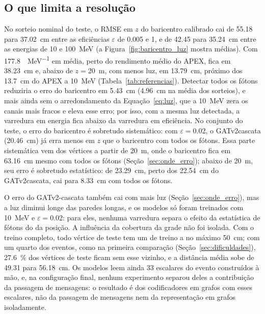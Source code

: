 \subsection{O que limita a resolução}
\label{sec:limites}

No sorteio nominal do teste, o RMSE em $z$ do baricentro calibrado cai de \num{55.18} para \qty{37.02}{\cm} entre as eficiências $\varepsilon$ de \num{0.005} e \num{1}, e de \num{42.45} para \qty{35.24}{\cm} entre as energias de \num{10} e \qty{100}{\MeV} (a Figura~\ref{fig:baricentro_luz} mostra médias). Com \qty{177.8}{\pe\per\MeV} em média, perto do rendimento médio do APEX, fica em \qty{38.23}{\cm} e, abaixo de $z = {}$\qty{20}{\m}, com menos luz, em \qty{13.79}{\cm}, próximo dos \qty{13.7}{\cm} do APEX a \qty{10}{\MeV} (Tabela~\ref{tab:referencias}). Detectar todos os fótons reduziria o erro do baricentro em \qty{5.43}{\cm} (\qty{4.96}{\cm} na média dos sorteios), e mais ainda sem o arredondamento da Equação~\eqref{eq:luz}, que a \qty{10}{\MeV} zera os canais mais fracos e eleva esse erro; por isso, com a mesma luz detectada, a varredura em energia fica abaixo da varredura em eficiência. No conjunto do teste, o erro do baricentro é sobretudo sistemático: com $\varepsilon = {}$\num{0.02}, o GATv2\discretionary{-}{-}{-}cascata (\qty{20.46}{\cm}) já erra menos em $z$ que o baricentro com todos os fótons. Essa parte sistemática vem dos vértices a partir de \qty{20}{\m}, onde o baricentro fica em \qty{63.16}{\cm} mesmo com todos os fótons (Seção~\ref{sec:onde_erro}); abaixo de \qty{20}{\m}, seu erro é sobretudo estatístico: de \qty{23.29}{\cm}, perto dos \qty{22.54}{\cm} do GATv2\discretionary{-}{-}{-}cascata, cai para \qty{8.33}{\cm} com todos os fótons.

O erro do GATv2-cascata também cai com mais luz (Seção~\ref{sec:onde_erro}), mas a luz diminui longe das paredes longas, e os modelos só foram treinados com \qty{10}{\MeV} e $\varepsilon = {}$\num{0.02}: para eles, nenhuma varredura separa o efeito da estatística de fótons do da posição. A influência da cobertura da grade não foi isolada. Com o treino completo, todo vértice de teste tem um de treino a no máximo \qty{50}{\cm}; com um quarto dos eventos, como na primeira comparação (Seção~\ref{sec:dificuldades}), \qty{27.6}{\percent} dos vértices de teste ficam sem esse vizinho, e a distância média sobe de \num{49.31} para \qty{56.18}{\cm}. Os modelos leem ainda \num{33} escalares do evento construídos à mão, e, na configuração final, nenhum experimento separou deles a contribuição da passagem de mensagens: o resultado é dos codificadores em grafos com esses escalares, não da passagem de mensagens nem da representação em grafos isoladamente.
